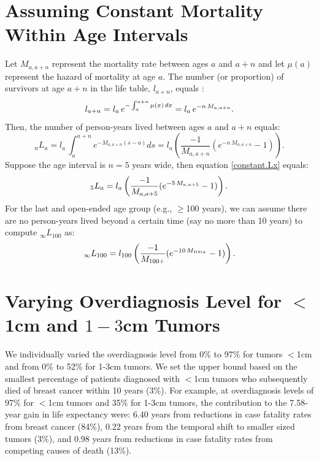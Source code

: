 \documentclass[11pt,letterpaper]{article}
\theoremstyle{plain}
\begin{document}
\section{Assuming Constant Mortality Within Age Intervals}
Let $M_{a,a+n}$ represent the mortality rate between ages $a$ and
$a+n$ and let $\mu(a)$ represent the hazard of mortality at age
$a$.  The number (or proportion) of survivors at age $a+n$ in the
life table, $l_{a+n}$, equals \cite{PreHeuGui00}:
\begin{equation}
l_{a+n}=l_{a}\,e^{-\int_a^{a+n}\mu(x)\,dx}=l_{a}\,e^{-n\,M_{a,a+n}}.\notag
\end{equation}
Then, the number of person-years lived between ages $a$ and $a+n$ equals:
\begin{equation}
_nL_{a}=l_a\,\int_a^{a+n} e^{-M_{a,a+n}(s-a)} ds=l_a \left(\frac{-1}{M_{a,a+n}}(e^{-n\,M_{a,a+n}}-1) \right).
\label{constant.Lx}
\end{equation}
Suppose the age interval is $n=5$ years wide, then equation \eqref{constant.Lx}
equals:
\begin{equation}
_5L_{a}=l_a \left(\frac{-1}{M_{a,a+5}}(e^{-5\,M_{a,a+5}}-1) \right).\notag
\end{equation}
For the last and open-ended age group (e.g., $\geq$100 years), we can assume there
are no person-years lived beyond a certain time (say no more than 10
years) to compute $_{\infty}L_{100}$ as:
\begin{equation}
_{\infty}L_{100}=l_{100} \left(\frac{-1}{M_{100+}}(e^{-10\,M_{100+}}-1) \right).\notag
\end{equation}

\newpage
\section{Varying Overdiagnosis Level for $<$1cm and $1-3$cm Tumors}
We individually varied the overdiagnosis level from 0\% to 97\% for
tumors $<$1cm and from 0\% to 52\% for 1-3cm tumors.  We set the upper
bound based on the smallest percentage of patients diagnosed with $<$1cm
tumors who subsequently died of breast cancer within 10 years (3\%).
For example, at overdiagnosis levels of 97\% for $<$1cm tumors and
35\% for 1-3cm tumors, the contribution to the 7.58-year gain in life
expectancy were: 6.40 years from reductions in case fatality rates
from breast cancer (84\%), 0.22 years from the temporal shift to
smaller sized tumors (3\%), and 0.98 years from reductions in case
fatality rates from competing causes of death (13\%).
\end{document}
